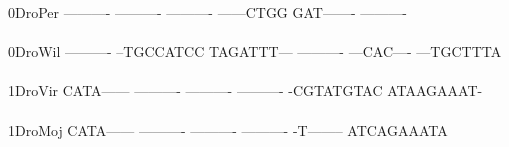 \documentclass[11pt,twoside,reqno,a4paper]{article}
\begin{document}
{0\hspace*{4\charwidth}DroPer	----------	----------	----------	------CTGG	GAT-------	----------	\\
\hspace*{5\charwidth}\hspace*{7\charwidth}\hspace*{1\charwidth}\hspace*{1\charwidth}\hspace*{1\charwidth}\hspace*{1\charwidth}\hspace*{1\charwidth}\hspace*{1\charwidth}\\
0\hspace*{4\charwidth}DroWil	----------	--TGCCATCC	TAGATTT---	----------	---CAC----	---TGCTTTA	\\
\hspace*{5\charwidth}\hspace*{7\charwidth}\hspace*{1\charwidth}\hspace*{1\charwidth}\hspace*{1\charwidth}\hspace*{1\charwidth}\hspace*{1\charwidth}\hspace*{1\charwidth}\\
1\hspace*{4\charwidth}DroVir	CATA------	----------	----------	----------	-CGTATGTAC	ATAAGAAAT-	\\
\hspace*{5\charwidth}\hspace*{7\charwidth}\hspace*{1\charwidth}\hspace*{1\charwidth}\hspace*{1\charwidth}\hspace*{1\charwidth}\hspace*{1\charwidth}\hspace*{1\charwidth}\\
1\hspace*{4\charwidth}DroMoj	CATA------	----------	----------	----------	-T--------	ATCAGAAATA	\\
\hspace*{5\charwidth}\hspace*{7\charwidth}\hspace*{1\charwidth}\hspace*{1\charwidth}\hspace*{1\charwidth}\hspace*{1\charwidth}\hspace*{1\charwidth}\hspace*{1\charwidth}\\
}
\end{document}
